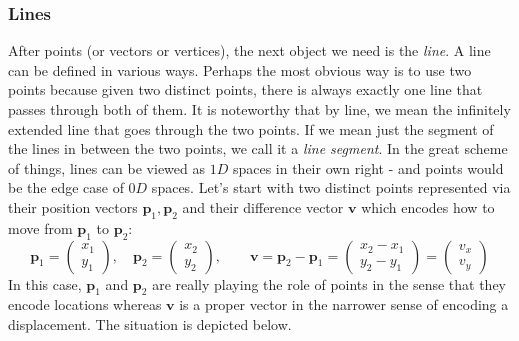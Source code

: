 \subsubsection{Lines}
After points (or vectors or vertices), the next object we need is the \emph{line}. A line can be defined in various ways. Perhaps the most obvious way is to use two points because given two distinct points, there is always exactly one line that passes through both of them. It is noteworthy that by line, we mean the infinitely extended line that goes through the two points. If we mean just the segment of the lines in between the two points, we call it a \emph{line segment}. In the great scheme of things, lines can be viewed as $1D$ spaces in their own right - and points would be the edge case of $0D$ spaces. Let's start with two distinct points represented via their position vectors $\mathbf{p}_1, \mathbf{p}_2$ and their difference vector $\mathbf{v}$ which encodes how to move from $\mathbf{p}_1$ to $\mathbf{p}_2$:
\begin{equation}
\mathbf{p}_1 = \begin{pmatrix} x_1 \\ y_1 \end{pmatrix}, \quad
\mathbf{p}_2 = \begin{pmatrix} x_2 \\ y_2 \end{pmatrix}, \qquad
\mathbf{v}   = \mathbf{p}_2 - \mathbf{p}_1 
             = \begin{pmatrix} x_2 - x_1 \\ y_2 - y_1 \end{pmatrix}
             = \begin{pmatrix} v_x \\ v_y \end{pmatrix}
\end{equation}
In this case, $\mathbf{p}_1$ and $\mathbf{p}_2$ are really playing the role of points in the sense that they encode locations whereas $\mathbf{v}$ is a proper vector in the narrower sense of encoding a displacement. The situation is depicted below.
